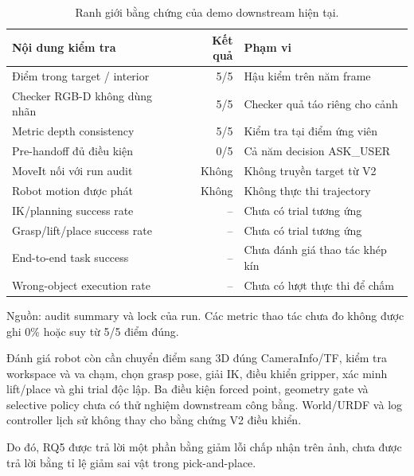 \begin{table}[htbp]
    \centering
    \setlength{\tabcolsep}{4pt}
    \renewcommand{\arraystretch}{1.15}
    \caption{Ranh giới bằng chứng của demo downstream hiện tại.}
    \label{tab:results-downstream-status}
    \small
    \begin{tabularx}{\textwidth}{@{}>{\raggedright\arraybackslash}p{}r>{\raggedright\arraybackslash}X@{}}
        \toprule
        Nội dung kiểm tra & Kết quả & Phạm vi \\
        \midrule
        Điểm trong target / interior & 5/5 & Hậu kiểm trên năm frame \\
        Checker RGB-D không dùng nhãn & 5/5 & Checker quả táo riêng cho cảnh \\
        Metric depth consistency & 5/5 & Kiểm tra tại điểm ứng viên \\
        Pre-handoff đủ điều kiện & 0/5 & Cả năm decision ASK\_USER \\
        MoveIt nối với run audit & Không & Không truyền target từ V2 \\
        Robot motion được phát & Không & Không thực thi trajectory \\
        IK/planning success rate & -- & Chưa có trial tương ứng \\
        Grasp/lift/place success rate & -- & Chưa có trial tương ứng \\
        End-to-end task success & -- & Chưa đánh giá thao tác khép kín \\
        Wrong-object execution rate & -- & Chưa có lượt thực thi để chấm \\
        \bottomrule
    \end{tabularx}
    \vspace{2pt}
    {\footnotesize\raggedright Nguồn: audit summary và lock của run.
    Các metric thao tác chưa đo không được ghi 0\%
    hoặc suy từ 5/5 điểm đúng.\par}
\end{table}

Đánh giá robot còn cần chuyển điểm sang 3D
đúng CameraInfo/TF, kiểm tra workspace và
va chạm, chọn grasp pose, giải IK, điều
khiển gripper, xác minh lift/place và
ghi trial độc lập. Ba điều kiện forced
point, geometry gate và selective policy
chưa có thử nghiệm downstream công bằng.
World/URDF và log controller lịch sử
không thay cho bằng chứng V2 điều khiển.

Do đó, RQ5 được trả lời một phần bằng
giảm lỗi chấp nhận trên ảnh, chưa được
trả lời bằng tỉ lệ giảm sai vật trong
pick-and-place.

